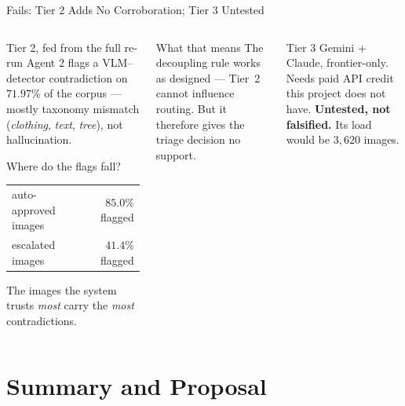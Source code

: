 \documentclass[aspectratio=169,11pt]{beamer}
\begin{document}
\begin{frame}{Fails: Tier 2 Adds No Corroboration; Tier 3 Untested}
\begin{columns}[T]
\begin{block}{\small Tier 2, fed from the full re-run}
\footnotesize Agent 2 flags a VLM--detector contradiction on $\mathbf{71.97\%}$ of the corpus --- mostly taxonomy mismatch (\emph{clothing}, \emph{text}, \emph{tree}), not hallucination.
\vspace{1mm}

Where do the flags fall?
\vspace{1mm}
\begin{center}
\begin{tabular}{@{}l r@{}}
auto-approved images & $\mathbf{85.0\%}$ flagged \\
escalated images & $41.4\%$ flagged \\
\end{tabular}
\end{center}
\vspace{1mm}
The images the system trusts \emph{most} carry the \emph{most} contradictions.
\end{block}

\begin{alertblock}{\small What that means}
\footnotesize The decoupling rule works as designed --- Tier~2 cannot influence routing. But it therefore gives the triage decision no support.
\end{alertblock}
\vspace{1mm}
\begin{block}{\small Tier 3}
\footnotesize Gemini + Claude, frontier-only. Needs paid API credit this project does not have. \textbf{Untested, not falsified.} Its load would be $3{,}620$ images.
\end{block}
\end{columns}
\end{frame}

\section{Summary and Proposal}
\end{document}
